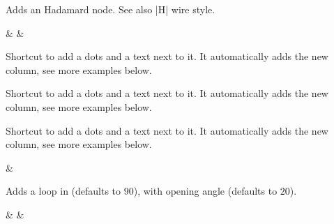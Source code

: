 \documentclass[a4paper]{ltxdoc}
\begin{document}
\begin{command}{\zxH{}}
  Adds an Hadamard node. See also |H| wire style.
\begin{codeexample}[width=3cm]
\begin{ZX}
  \zxNone{} \rar & \zxH{} \rar & \zxNone{}
\end{ZX}
\end{codeexample}
\end{command}



\begin{command}{\leftManyDots{}}
  Shortcut to add a dots and a text next to it. It automatically adds the new column, see more examples below.
\begin{codeexample}[]
\begin{ZX}
   \zxX{\alpha}
\end{ZX}
\end{codeexample}
\end{command}

\begin{command}{\leftManyDots{}}
  Shortcut to add a dots and a text next to it. It automatically adds the new column, see more examples below.
\begin{codeexample}[width=3cm]
\begin{ZX}
  \zxX{\alpha} 
\end{ZX}
\end{codeexample}
\end{command}

\begin{command}{\middleManyDots{}}
  Shortcut to add a dots and a text next to it. It automatically adds the new column, see more examples below.
\begin{codeexample}[width=3cm]
\begin{ZX}
  \zxX{\alpha} \middleManyDots{} & \zxX{\beta}
\end{ZX}
\end{codeexample}
\end{command}

\begin{command}{\zxLoop{}}
  Adds a loop in  (defaults to $90$), with opening angle  (defaults to $20$).
\begin{codeexample}[width=3cm]
\begin{ZX}
  \zxX{\alpha} \zxLoop{} & \zxX{} \zxLoop[45]{} & \zxX{} \zxLoop[0][30][red]{}
\end{ZX}
\end{codeexample}
\end{command}
\end{document}

